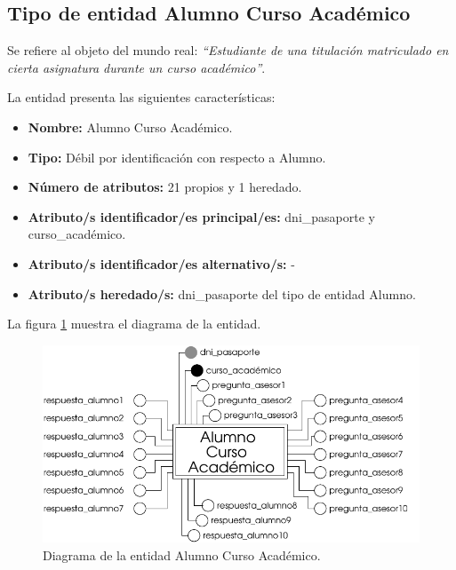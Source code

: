 \subsection{Tipo de entidad Alumno Curso Académico}

   \begin{description}

   \item[Definición] Se refiere al objeto del mundo real: \emph{``Estudiante de
   una titulación matriculado en cierta asignatura durante un curso académico''}.

   \item[Características] La entidad presenta las siguientes características:
      \begin{itemize}
         \item \textbf{Nombre:} Alumno Curso Académico.
         \item \textbf{Tipo:} Débil por identificación con respecto a Alumno.
         \item \textbf{Número de atributos:} 21 propios y 1 heredado.
         \item \textbf{Atributo/s identificador/es principal/es:} dni\_pasaporte y \\curso\_académico.
         \item \textbf{Atributo/s identificador/es alternativo/s:} -
         \item \textbf{Atributo/s heredado/s:} dni\_pasaporte del tipo
         de entidad Alumno.
      \end{itemize}

   \item[Diagrama] La figura \ref{diagramaAlumnoCA} muestra el diagrama de la entidad.
   \item \begin{figure}[!ht]
            \begin{center}
            \includegraphics[]{07.Modelo_Entidad-Interrelacion/7.2.Analisis_Entidades/diagramas/alumnoca.pdf}
            \caption{Diagrama de la entidad Alumno Curso Académico.}
            \label{diagramaAlumnoCA}
            \end{center}
         \end{figure}


\end{description}
